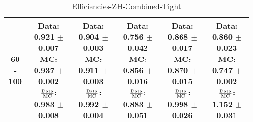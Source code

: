 \documentclass[final,letterpaper,twoside,12pt]{article}
\begin{document}
\begin{table}[htbp]
\begin{adjustwidth}{-4em}{-4em}
\begin{tabular}{|c|c|c|c|c|c|}
60 - 100 & \parbox[c]{1.1 in}{ \scriptsize  Data: 0.921 $\pm$ 0.007 \newline MC: 0.937 $\pm$ 0.002 \newline $\frac{\rm{Data}}{\rm{MC}}$: 0.983 $\pm$ 0.008} & \parbox[c]{1.1 in}{ \scriptsize  Data: 0.904 $\pm$ 0.003 \newline MC: 0.911 $\pm$ 0.003 \newline $\frac{\rm{Data}}{\rm{MC}}$: 0.992 $\pm$ 0.004} & \parbox[c]{1.1 in}{ \scriptsize  Data: 0.756 $\pm$ 0.042 \newline MC: 0.856 $\pm$ 0.016 \newline $\frac{\rm{Data}}{\rm{MC}}$: 0.883 $\pm$ 0.051} & \parbox[c]{1.1 in}{ \scriptsize  Data: 0.868 $\pm$ 0.017 \newline MC: 0.870 $\pm$ 0.015 \newline $\frac{\rm{Data}}{\rm{MC}}$: 0.998 $\pm$ 0.026} & \parbox[c]{1.1 in}{ \scriptsize  Data: 0.860 $\pm$ 0.023 \newline MC: 0.747 $\pm$ 0.002 \newline $\frac{\rm{Data}}{\rm{MC}}$: 1.152 $\pm$ 0.031}\\ \hline 
\end{tabular}
\caption {Efficiencies-ZH-Combined-Tight}
\label{tab:cqdata0}
\end{adjustwidth}\end{table}
\end{document}
